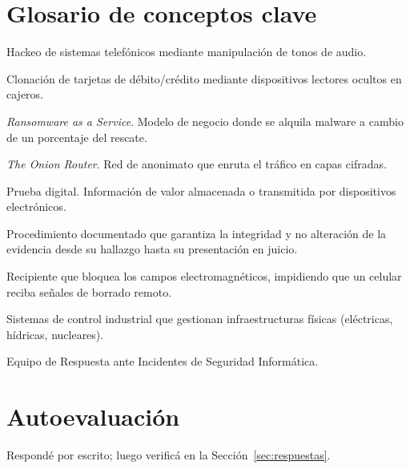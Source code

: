 \documentclass[11pt,a4paper]{article}
\begin{document}
\section{Glosario de conceptos clave}
\begin{description}[leftmargin=!, labelwidth=3.5cm, font=\bfseries]
  \item[Phreaking] Hackeo de sistemas telefónicos mediante manipulación de tonos de audio.
  \item[Skimming] Clonación de tarjetas de débito/crédito mediante dispositivos lectores ocultos en cajeros.
  \item[RaaS] \textit{Ransomware as a Service}. Modelo de negocio donde se alquila malware a cambio de un porcentaje del rescate.
  \item[TOR] \textit{The Onion Router}. Red de anonimato que enruta el tráfico en capas cifradas.
  \item[E-Evidence] Prueba digital. Información de valor almacenada o transmitida por dispositivos electrónicos.
  \item[Cadena de Custodia] Procedimiento documentado que garantiza la integridad y no alteración de la evidencia desde su hallazgo hasta su presentación en juicio.
  \item[Bolsa de Faraday] Recipiente que bloquea los campos electromagnéticos, impidiendo que un celular reciba señales de borrado remoto.
  \item[SCADA] Sistemas de control industrial que gestionan infraestructuras físicas (eléctricas, hídricas, nucleares).
  \item[CSIRT] Equipo de Respuesta ante Incidentes de Seguridad Informática.
\end{description}

\section{Autoevaluación}\label{sec:autoeval}
Respondé por escrito; luego verificá en la Sección~\ref{sec:respuestas}.
\end{document}
